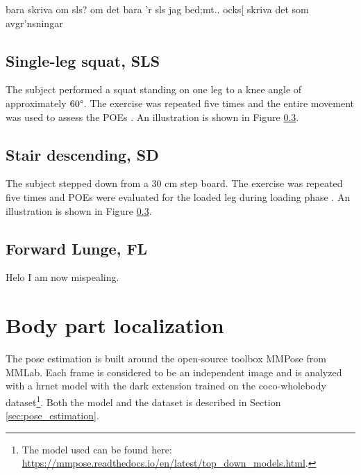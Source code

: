 bara skriva om sls? om det bara 'r sls jag bed;mt.. ocks[ skriva det som avgr'nsningar

\subsection{Single-leg squat, SLS} \label{sec:met-SLS}
The subject performed a squat standing on one leg to a knee angle of approximately $60\degree$. The exercise was repeated five times and the entire movement was used to assess the POEs \cite{Nae2020}. An illustration is shown in Figure \ref{}.

\subsection{Stair descending, SD}
The subject stepped down from a 30 cm step board. The exercise was repeated five times and POEs were evaluated for the loaded leg during loading phase \cite{Nae2020}. An illustration is shown in Figure \ref{}.

\subsection{Forward Lunge, FL}

Helo I am now mispealing.





\section{Body part localization} \label{sec:met-loc}
The pose estimation is built around the open-source toolbox MMPose \cite{mmpose} from MMLab. Each frame is considered to be an independent image and is analyzed with a \gls{hrnet} model with the \gls{dark} extension trained on the \gls{coco}-wholebody dataset\footnote{The model used can be found here: \url{https://mmpose.readthedocs.io/en/latest/top_down_models.html}.}. Both the model and the dataset is described in Section \ref{sec:pose_estimation}. %

